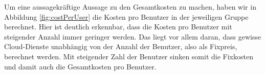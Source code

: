 \documentclass{article}
\begin{document}
Um eine aussagekräftige Aussage zu den Gesamtkosten zu machen, haben wir in Abbildung \ref{fig:costPerUser} die Kosten pro Benutzer in der jeweiligen Gruppe berechnet. Hier ist deutlich erkennbar, dass die Kosten pro Benutzer mit steigender Anzahl immer geringer werden. Das liegt vor allem daran, dass gewisse Cloud-Dienste unabhängig von der Anzahl der Benutzer, also als Fixpreis, berechnet werden. Mit steigender Zahl der Benutzer sinken somit die Fixkosten und damit auch die Gesamtkosten pro Benutzer.

\newpage

\appendix


\newpage

{}

\end{document}
